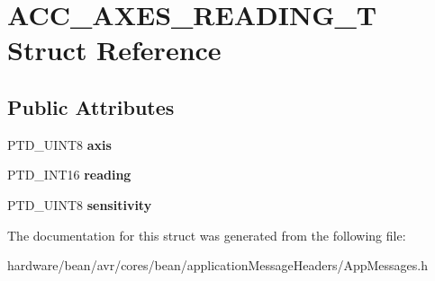 \hypertarget{struct_a_c_c___a_x_e_s___r_e_a_d_i_n_g___t}{}\section{A\+C\+C\+\_\+\+A\+X\+E\+S\+\_\+\+R\+E\+A\+D\+I\+N\+G\+\_\+T Struct Reference}
\label{struct_a_c_c___a_x_e_s___r_e_a_d_i_n_g___t}
\subsection*{Public Attributes}
\begin{DoxyCompactItemize}
\item 
P\+T\+D\+\_\+\+U\+I\+N\+T8 {\bfseries axis}\hypertarget{struct_a_c_c___a_x_e_s___r_e_a_d_i_n_g___t_ae69a9b056f681d3f3822fa9abd829334}{}\label{struct_a_c_c___a_x_e_s___r_e_a_d_i_n_g___t_ae69a9b056f681d3f3822fa9abd829334}

\item 
P\+T\+D\+\_\+\+I\+N\+T16 {\bfseries reading}\hypertarget{struct_a_c_c___a_x_e_s___r_e_a_d_i_n_g___t_a66d4a402c79f1769dd23c6e91600862e}{}\label{struct_a_c_c___a_x_e_s___r_e_a_d_i_n_g___t_a66d4a402c79f1769dd23c6e91600862e}

\item 
P\+T\+D\+\_\+\+U\+I\+N\+T8 {\bfseries sensitivity}\hypertarget{struct_a_c_c___a_x_e_s___r_e_a_d_i_n_g___t_a726d2fb3bec4083a4c3abfeaae5f4f11}{}\label{struct_a_c_c___a_x_e_s___r_e_a_d_i_n_g___t_a726d2fb3bec4083a4c3abfeaae5f4f11}

\end{DoxyCompactItemize}


The documentation for this struct was generated from the following file\+:\begin{DoxyCompactItemize}
\item 
hardware/bean/avr/cores/bean/application\+Message\+Headers/App\+Messages.\+h\end{DoxyCompactItemize}
